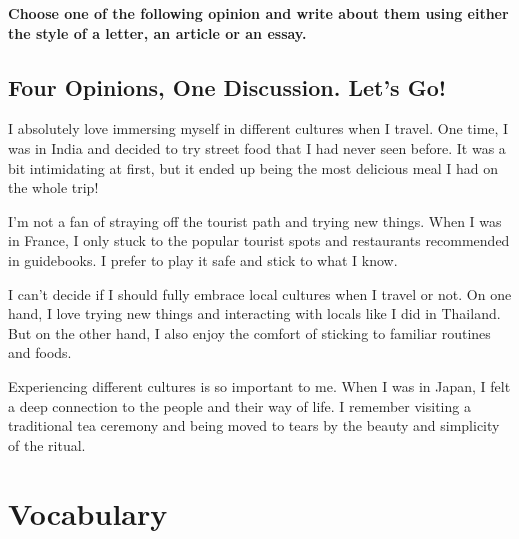 \documentclass[]{article} %
\begin{document}
	\newpage
	
	\begin{question}
		\textbf{Choose one of the following opinion and write about them using either the style of a letter, an article or an essay.}
	\end{question}	
	
	\vspace{1cm}
	\begin{minipage}[h]{0.95\textwidth}
		
		
		\subsection*{Four Opinions, One Discussion. Let's Go!}
		\begin{dialogue}
			
			
			 I absolutely love immersing myself in different cultures when I travel. One time,
			I was in India and decided to try street food that I had never seen before. It was a
			bit intimidating at first, but it ended up being the most delicious meal I had on
			the whole trip! \par 
			 I'm not a fan of straying off the tourist path and trying new things. When I was in
			France, I only stuck to the popular tourist spots and restaurants recommended in
			guidebooks. I prefer to play it safe and stick to what I know. \par 
			
			 I can't decide if I should fully embrace local cultures when I travel or not. On one
			hand, I love trying new things and interacting with locals like I did in Thailand. But
			on the other hand, I also enjoy the comfort of sticking to familiar routines and
			foods. \par 
			 Experiencing different cultures is so important to me. When I was in Japan, I felt
			a deep connection to the people and their way of life. I remember visiting a
			traditional tea ceremony and being moved to tears by the beauty and simplicity
			of the ritual. \par 
			
		\end{dialogue}
		
		
	\end{minipage}
	
	\vspace{1cm}
	
	
	
	
	\section*{Vocabulary}
	
\end{document}
